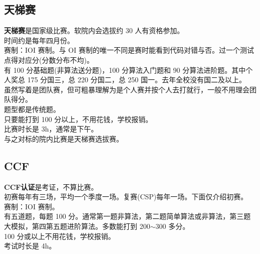 \documentclass{beamer}
\begin{document}
\subsection{天梯赛}
\begin{frame}
    \textbf{\color[RGB]{34, 166, 242}天梯赛}是国家级比赛。软院内会选拔约 30 人有资格参加。\\
    时间约是每年四月份。\\
    赛制：IOI 赛制。与 OI 赛制的唯一不同是赛时能看到代码对错与否。过一个测试点得对应分(分数分布不均)。\\
    有 100 分基础题(非算法送分题)，100 分算法入门题和 90 分算法进阶题。其中个人奖总 175 分国三，总 220 分国二，总 250 国一。去年全校没有国二及以上。\\
    虽然写着是团队赛，但可粗暴理解为是个人赛并按个人去打就行，一般不用理会团队得分。\\
    题型都是传统题。\\
    只要能打到 100 分以上，不用花钱，学校报销。\\
    比赛时长是 3h，通常是下午。\\
    与之对标的院内比赛是天梯赛选拔赛。
\end{frame}

\subsection{CCF}
\begin{frame}
    \textbf{\color[RGB]{34, 166, 242}CCF认证}是考证，不算比赛。\\
    初赛每年有三场，平均一个季度一场。复赛(CSP)每年一场。下面仅介绍初赛。\\
    赛制：IOI 赛制。\\
    有五道题，每题 100 分。通常第一题非算法，第二题简单算法或非算法，第三题大模拟，第四第五题进阶算法。多数能打到 200$\sim$300 多分。\\
    100 分或以上不用花钱，学校报销。\\
    考试时长是 4h。
\end{frame}
\end{document}
